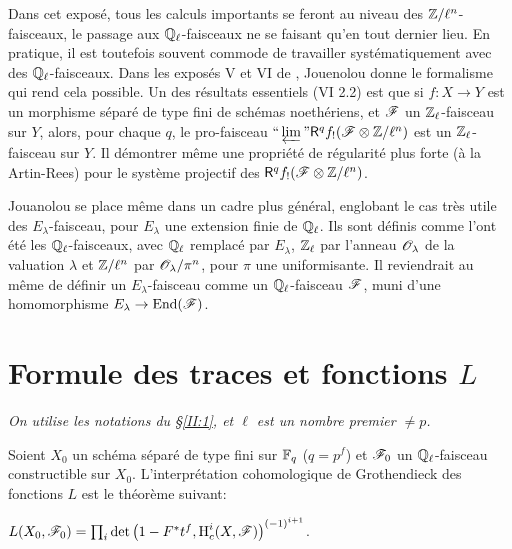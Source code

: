 Dans cet exposé, tous les calculs importants se feront au niveau des 
$\mathbb{Z}/\ell^n$-faisceaux, le passage aux $\mathbb{Q}_\ell$-faisceaux ne se faisant qu'en 
tout dernier lieu. En pratique, il est toutefois souvent commode de travailler 
systématiquement avec des $\mathbb{Q}_\ell$-faisceaux. Dans les exposés 
V et VI de \cite{SGA5}, Jouenolou donne le formalisme qui rend cela possible. 
Un des résultats essentiels (VI 2.2) est que si $f:X\to Y$ est un morphisme 
séparé de type fini de schémas noethériens, et $\mathscr{F}$ un 
$\mathbb{Z}_\ell$-faisceau sur $Y$, alors, pour chaque $q$, le pro-faisceau 
$\text{``}\varprojlim\text{''}\mathsf{R}^q f_! (\mathscr{F}\otimes\mathbb{Z}/\ell^n)$ est un 
$\mathbb{Z}_\ell$-faisceau sur $Y$. Il démontrer même une propriété de 
régularité plus forte (à la Artin-Rees) pour le système projectif des 
$\mathsf{R}^q f_!(\mathscr{F}\otimes\mathbb{Z}/\ell^n)$. 

Jouanolou se place même dans un cadre plus général, englobant le cas 
très utile des $E_\lambda$-faisceau, pour $E_\lambda$ une extension finie de 
$\mathbb{Q}_\ell$. Ils sont définis comme l'ont été les $\mathbb{Q}_\ell$-faisceaux, 
avec $\mathbb{Q}_\ell$ remplacé par $E_\lambda$, $\mathbb{Z}_\ell$ par l'anneau 
$\mathscr{O}_\lambda$ de la valuation $\lambda$ et $\mathbb{Z}/\ell^n$ par 
$\mathscr{O}_\lambda/\pi^n$, pour $\pi$ une uniformisante. Il reviendrait au même de 
définir un $E_\lambda$-faisceau comme un $\mathbb{Q}_\ell$-faisceau $\mathscr{F}$, muni 
d'une homomorphisme $E_\lambda\to\operatorname{End}(\mathscr{F})$. 










\section{Formule des traces et fonctions \texorpdfstring{$L$}{L}}\label{II:3}

\emph{On utilise les notations du \S\ref{II:1}, et $\ell$ est un nombre premier 
$\ne p$.}

Soient $X_0$ un schéma séparé de type fini sur $\mathbb{F}_q$ ($q=p^f$) et 
$\mathscr{F}_0$ un $\mathbb{Q}_\ell$-faisceau constructible sur $X_0$. L'interprétation 
cohomologique de Grothendieck des fonctions $L$ est le théorème suivant: 





\begin{theorem_}\label{II:3-1}
$L(X_0,\mathscr{F}_0) = \prod_i \det\left(1-F^* t^f, \operatorname{H}_c^i(X,\mathscr{F})\right)^{(-1)^{i+1}}$. 
\end{theorem_}

